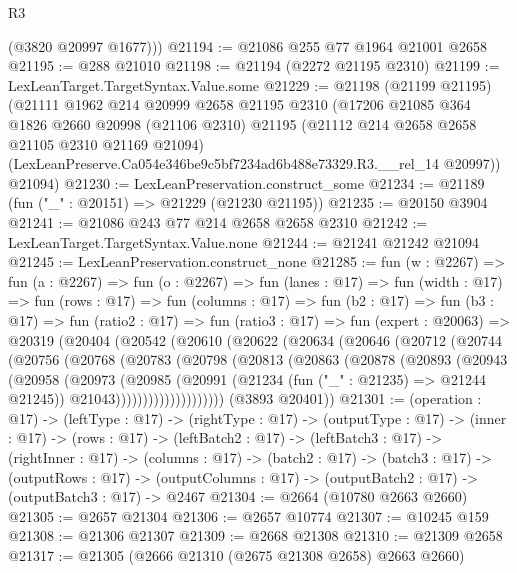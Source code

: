 \begin{lexlean}{R3}
\begin{coremodule}
        (@3820 @20997 @1677)))
@21194 := @21086 @255 @77 @1964 @21001 @2658
@21195 := @288 @21010
@21198 := @21194 (@2272 @21195 @2310)
@21199 := LexLeanTarget.TargetSyntax.Value.some
@21229 := @21198
    (@21199 @21195)
    (@21111
      @1962
      @214
      @20999
      @2658
      @21195
      @2310
      (@17206
        @21085
        @364
        @1826
        @2660
        @20998
        (@21106 @2310)
        @21195
        (@21112 @214 @2658 @2658 @21105 @2310 @21169 @21094)
        (LexLeanPreserve.Ca054e346be9c5bf7234ad6b488e73329.R3.__rel_14 @20997))
      @21094)
@21230 := LexLeanPreservation.construct_some
@21234 := @21189 (fun ("_" : @20151) => @21229 (@21230 @21195))
@21235 := @20150 @3904
@21241 := @21086 @243 @77 @214 @2658 @2658 @2310
@21242 := LexLeanTarget.TargetSyntax.Value.none
@21244 := @21241 @21242 @21094
@21245 := LexLeanPreservation.construct_none
@21285 := fun (w : @2267) =>
  fun (a : @2267) =>
  fun (o : @2267) =>
  fun (lanes : @17) =>
  fun (width : @17) =>
  fun (rows : @17) =>
  fun (columns : @17) =>
  fun (b2 : @17) =>
  fun (b3 : @17) =>
  fun (ratio2 : @17) =>
  fun (ratio3 : @17) =>
  fun (expert : @20063) =>
  @20319
    (@20404
      (@20542
        (@20610
          (@20622
            (@20634
              (@20646
                (@20712
                  (@20744
                    (@20756
                      (@20768
                        (@20783
                          (@20798
                            (@20813
                              (@20863
                                (@20878
                                  (@20893
                                    (@20943
                                      (@20958
                                        (@20973
                                          (@20985
                                            (@20991
                                              (@21234 (fun ("_" : @21235) => @21244 @21245))
                                              @21043))))))))))))))))))))
      (@3893 @20401))
@21301 := (operation : @17) ->
  (leftType : @17) ->
  (rightType : @17) ->
  (outputType : @17) ->
  (inner : @17) ->
  (rows : @17) ->
  (leftBatch2 : @17) ->
  (leftBatch3 : @17) ->
  (rightInner : @17) ->
  (columns : @17) ->
  (batch2 : @17) ->
  (batch3 : @17) ->
  (outputRows : @17) ->
  (outputColumns : @17) -> (outputBatch2 : @17) -> (outputBatch3 : @17) -> @2467
@21304 := @2664 (@10780 @2663 @2660)
@21305 := @2657 @21304
@21306 := @2657 @10774
@21307 := @10245 @159
@21308 := @21306 @21307
@21309 := @2668 @21308
@21310 := @21309 @2658
@21317 := @21305 (@2666 @21310 (@2675 @21308 @2658) @2663 @2660)

\end{coremodule}
\end{lexlean}
